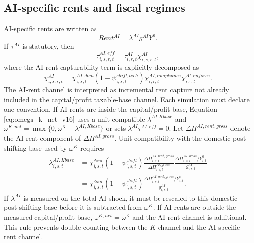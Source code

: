 \documentclass[11pt,a4paper]{article}
\begin{document}
\subsection{AI-specific rents and fiscal regimes}

AI-specific rents are written as
\begin{equation}
    Rent^{AI}=\lambda^{AI}g^{AI}Y^0.
\end{equation}
If $\tau^{AI}$ is statutory, then
\begin{equation}\label{eq:ai_eff_decomp_v21}
    \tau^{AI,eff}_{i,s,r,t}=\tau^{AI}_{i,r,t}\chi^{AI}_{i,s,r,t},
\end{equation}
where the AI-rent capturability term is explicitly decomposed as
\begin{equation}\label{eq:chi_ai_decomp_v21}
    \chi^{AI}_{i,s,r,t}
    =\chi^{AI,dom}_{i,s,t}(1-\psi^{shift,tech}_{i,s,t})
    \chi^{AI,compliance}_{i,r,t}\chi^{AI,enforce}_{i,r,t}.
\end{equation}
The AI-rent channel is interpreted as incremental rent capture not already included in the capital/profit taxable-base channel. Each simulation must declare one convention. If AI rents are inside the capital/profit base, Equation \eqref{eq:omega_k_net_v16} uses a unit-compatible $\lambda^{AI,Kbase}$ and $\omega^{K,net}=\max\{0,\omega^K-\lambda^{AI,Kbase}\}$ or sets $\lambda^{AI}\tau^{AI,eff}=0$. Let $\Delta\Pi^{AI,rent,gross}$ denote the AI-rent component of $\Delta\Pi^{AI,gross}$. Unit compatibility with the domestic post-shifting base used by $\omega^K$ requires
\begin{equation}
\begin{split}
    \lambda^{AI,Kbase}_{i,s,t}
    &=\chi^{dom}_{i,s,t}(1-\psi^{shift}_{i,s,t})
    \frac{\Delta\Pi^{AI,rent,gross}_{i,s,t}}{\Delta\Pi^{AI,gross}_{i,s,t}}
    \frac{\Delta\Pi^{AI,gross}_{i,s,t}/Y^0_{i,t}}{g^{AI}_{i,s,t}}\\
    &=\chi^{dom}_{i,s,t}(1-\psi^{shift}_{i,s,t})
    \frac{\Delta\Pi^{AI,rent,gross}_{i,s,t}/Y^0_{i,t}}{g^{AI}_{i,s,t}}.
\end{split}
\end{equation}
If $\lambda^{AI}$ is measured on the total AI shock, it must be rescaled to this domestic post-shifting base before it is subtracted from $\omega^K$. If AI rents are outside the measured capital/profit base, $\omega^{K,net}=\omega^K$ and the AI-rent channel is additional. This rule prevents double counting between the $K$ channel and the AI-specific rent channel.
\end{document}
